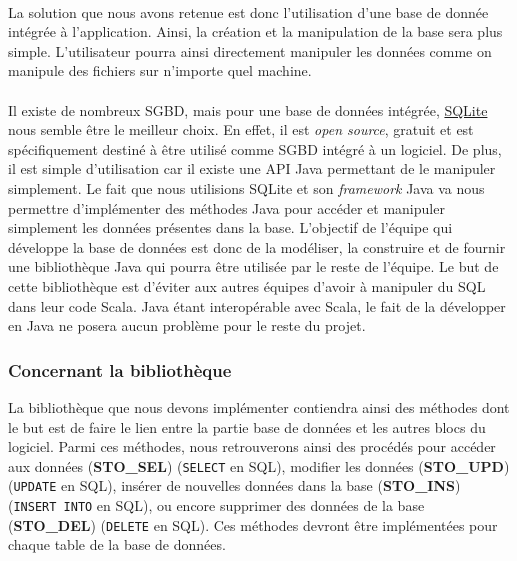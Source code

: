 \paragraph{}
La solution que nous avons retenue est donc l’utilisation d’une base de donnée 
intégrée à l’application. Ainsi, la création et la manipulation de la base 
sera plus simple. L’utilisateur pourra ainsi directement manipuler les données 
comme on manipule des fichiers sur n’importe quel machine.

\paragraph{}
Il existe de nombreux SGBD, mais pour une base de données intégrée,
\href{https://sqlite.org/index.html}{SQLite} nous semble être le meilleur
choix. En effet, il est \textit{open source}, gratuit et est spécifiquement
destiné à être utilisé comme SGBD intégré à un logiciel. De plus, il est
simple d’utilisation car il existe une API Java permettant de le manipuler
simplement. Le fait que nous utilisions SQLite et son
\textit{framework} Java va nous permettre d’implémenter des méthodes Java pour
accéder et manipuler simplement les données présentes dans la base. L’objectif
de l’équipe qui développe la base de données est donc de la modéliser, la
construire et de fournir une bibliothèque Java qui pourra être utilisée par le
reste de l’équipe. Le but de cette bibliothèque est d’éviter aux autres équipes
d’avoir à manipuler du SQL dans leur code Scala. Java étant interopérable avec
Scala, le fait de la développer en Java ne posera aucun problème pour le reste
du projet.

\subsubsection{Concernant la bibliothèque}

La bibliothèque que nous devons implémenter contiendra ainsi des méthodes dont
le but est de faire le lien entre la partie base de données et les autres
blocs du logiciel. Parmi ces méthodes, nous retrouverons ainsi des procédés
pour accéder aux données (\textbf{STO\_SEL}) (\texttt{SELECT} en SQL),
modifier les données (\textbf{STO\_UPD}) (\texttt{UPDATE} en SQL), insérer de
nouvelles données dans la base (\textbf{STO\_INS}) (\texttt{INSERT INTO} en
SQL), ou encore supprimer des données de la base (\textbf{STO\_DEL})
(\texttt{DELETE} en SQL). Ces méthodes devront être implémentées pour chaque
table de la base de données.

